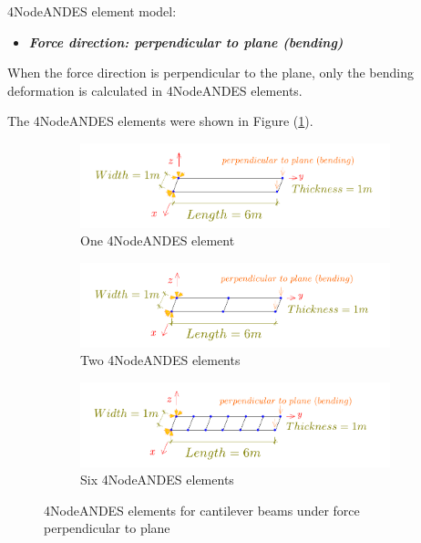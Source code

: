 \documentclass[fleqn,11pt,letter]{article}
\begin{document}
4NodeANDES element model:

\vskip 12pt

\begin{itemize}
  \item \textbf{\emph{Force direction: perpendicular to plane (bending)}}
\end{itemize}
When the force direction is perpendicular to the plane, only the bending deformation is calculated in 4NodeANDES elements. 


The 4NodeANDES elements were shown in Figure (\ref{fig 4NodeANDES elements for cantilever beams under force perpendicular to plane}).

\begin{figure}[H]
  \centering
  \begin{subfigure}{0.5\textwidth}
    \centering
    \includegraphics[width=9cm]{../Figure_files/4NodeANDES/beam_ANDES_xy_bending_1div.pdf}
    \caption{One 4NodeANDES element}
  \end{subfigure}
  \vskip 8pt
  \begin{subfigure}{0.5\textwidth}
    \centering
    \includegraphics[width=9cm]{../Figure_files/4NodeANDES/beam_ANDES_xy_bending_2div.pdf}
    \caption{Two 4NodeANDES elements}
  \end{subfigure}
  \vskip 8pt
  \begin{subfigure}{0.5\textwidth}
    \centering
    \includegraphics[width=9cm]{../Figure_files/4NodeANDES/beam_ANDES_xy_bending_6div.pdf}
    \caption{Six 4NodeANDES elements}
  \end{subfigure}
  \captionsetup{justification=centering,margin=3cm}
  \caption{4NodeANDES elements for cantilever beams under force perpendicular to plane}
  \label{fig 4NodeANDES elements for cantilever beams under force perpendicular to plane}
\end{figure}
\end{document}
